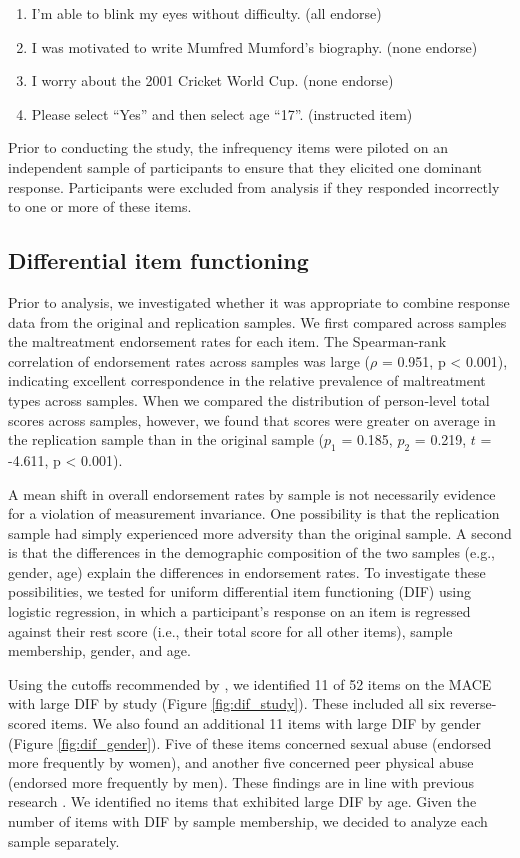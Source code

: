 \documentclass[letterpaper,man,natbib,longtable,floatsintext,12pt]{apa6}
\begin{document}
\begin{enumerate}
    \item I'm able to blink my eyes without difficulty. (all endorse)
    \item I was motivated to write Mumfred Mumford's biography. (none endorse)
    \item I worry about the 2001 Cricket World Cup. (none endorse)
    \item Please select ``Yes'' and then select age ``17''. (instructed item)
\end{enumerate}

\noindent Prior to conducting the study, the infrequency items were piloted on an independent sample of participants to ensure that they elicited one dominant response. Participants were excluded from analysis if they responded incorrectly to one or more of these items.

\subsection*{Differential item functioning}

Prior to analysis, we investigated whether it was appropriate to combine response data from the original and replication samples. We first compared across samples the maltreatment endorsement rates for each item. The Spearman-rank correlation of endorsement rates across samples was large ($\rho$ = 0.951, p < 0.001), indicating excellent correspondence in the relative prevalence of maltreatment types across samples. When we compared the distribution of person-level total scores across samples, however, we found that scores were greater on average in the replication sample than in the original sample ($p_1$ = 0.185, $p_2$ = 0.219, $t$ = -4.611, p < 0.001). 

A mean shift in overall endorsement rates by sample is not necessarily evidence for a violation of measurement invariance. One possibility is that the replication sample had simply experienced more adversity than the original sample. A second is that the differences in the demographic composition of the two samples (e.g., gender, age) explain the differences in endorsement rates. To investigate these possibilities, we tested for uniform differential item functioning (DIF) using logistic regression, in which a participant's response on an item is regressed against their rest score (i.e., their total score for all other items), sample membership, gender, and age.

Using the cutoffs recommended by , we identified 11 of 52 items on the MACE with large DIF by study (Figure \ref{fig:dif_study}). These included all six reverse-scored items. We also found an additional 11 items with large DIF by gender (Figure \ref{fig:dif_gender}). Five of these items concerned sexual abuse (endorsed more frequently by women), and another five concerned peer physical abuse (endorsed more frequently by men). These findings are in line with previous research . We identified no items that exhibited large DIF by age. Given the number of items with DIF by sample membership, we decided to analyze each sample separately.
\end{document}
